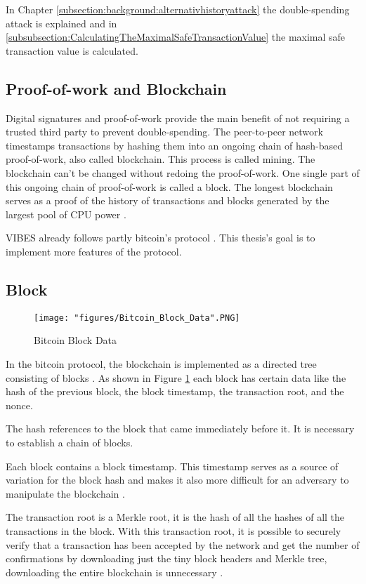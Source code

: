 In Chapter \ref{subsection:background:alternativhistoryattack} the double-spending attack is explained and in \ref{subsubsection:CalculatingTheMaximalSafeTransactionValue} the maximal safe transaction value is calculated.

\subsection{Proof-of-work and Blockchain}
Digital signatures and proof-of-work provide the main benefit of not requiring a trusted third party to prevent double-spending. The peer-to-peer network timestamps transactions by hashing them into an ongoing chain of hash-based proof-of-work, also called blockchain. This process is called mining. The blockchain can't be changed without redoing the proof-of-work. One single part of this ongoing chain of proof-of-work is called a block. The longest blockchain serves as a proof of the history of transactions and blocks generated by the largest pool of CPU power \cite{nakamoto2012bitcoin}.

VIBES already follows partly bitcoin's protocol \cite{vibes}. This thesis's goal is to implement more features of the protocol.

\subsection{Block}
\begin{figure}[!htb]
\centering
\texttt{[image: "figures/Bitcoin\_Block\_Data".PNG]}
\caption{Bitcoin Block Data \cite{bitcoinBlockData}
\label{fig:bitcoinBlockData}}
\end{figure}

In the bitcoin protocol, the blockchain is implemented as a directed tree consisting of blocks \citep{vibes}. As shown in Figure \ref{fig:bitcoinBlockData} each block has certain data like the hash of the previous block, the block timestamp, the transaction root, and the nonce.

The hash references to the block that came immediately before it. It is necessary to establish a chain of blocks.

Each block contains a block timestamp. This timestamp serves as a source of variation for the block hash and makes it also more difficult for an adversary to manipulate the blockchain \cite{blockTime}. 

The transaction root is a Merkle root, it is the hash of all the hashes of all the transactions in the block. With this transaction root, it is possible to securely verify that a transaction has been accepted by the network and get the number of confirmations by downloading just the tiny block headers and Merkle tree, downloading the entire blockchain is unnecessary \citep{merkleRoot}. 

